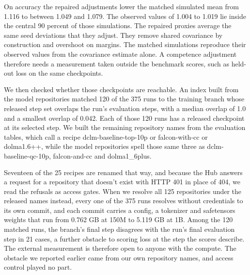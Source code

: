 On accuracy the repaired adjustments lower the matched simulated mean from 1.116 to between 1.049 and 1.079. The observed values of 1.004 to 1.019 lie inside the central 90 percent of those simulations. The repaired proxies average the same seed deviations that they adjust. They remove shared covariance by construction and overshoot on margins. The matched simulations reproduce their observed values from the covariance estimate alone. A competence adjustment therefore needs a measurement taken outside the benchmark scores, such as held-out loss on the same checkpoints.

We then checked whether those checkpoints are reachable. An index built from the model repositories matched 120 of the 375 runs to the training branch whose released step set overlaps the run's evaluation steps, with a median overlap of 1.0 and a smallest overlap of 0.042. Each of those 120 runs has a released checkpoint at its selected step. We built the remaining repository names from the evaluation tables, which call a recipe dclm-baseline-top-10p or falcon-with-cc or dolma1.6++, while the model repositories spell those same three as dclm-baseline-qc-10p, falcon-and-cc and dolma1\_6plus.

Seventeen of the 25 recipes are renamed that way, and because the Hub answers a request for a repository that doesn't exist with HTTP 401 in place of 404, we read the refusals as access gates. When we resolve all 125 repositories under the released names instead, every one of the 375 runs resolves without credentials to its own commit, and each commit carries a config, a tokenizer and safetensors weights that run from 0.762 GB at 150M to 5.119 GB at 1B. Among the 120 matched runs, the branch's final step disagrees with the run's final evaluation step in 21 cases, a further obstacle to scoring loss at the step the scores describe. The external measurement is therefore open to anyone with the compute. The obstacle we reported earlier came from our own repository names, and access control played no part.

